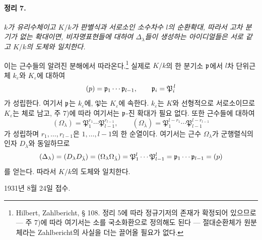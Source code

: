 \paragraph{정리 7.}
\emph{\(k\)가 유리수체이고 \(K/k\)가 판별식과 서로소인 소수차수 \(l\)의 순환확대, 따라서 고차 분기가 없는 확대이면, 비자명표현들에 대하여 \(\Delta_\lambda\)들이 생성하는 아이디얼들은 서로 같고 \(K/k\)의 도체와 일치한다.}

이는 근수들의 알려진 분해에서 따라온다.\footnote{Hilbert, Zahlbericht, § 108. 정리 5에 따라 정규기저의 존재가 확정되어 있으므로 --- 주 7)에 따라 여기서는 소를 국소화환으로 정의해도 된다 --- 절대순환체가 원분체라는 Zahlbericht의 사실을 더는 끌어올 필요가 없다.} 실제로 \(K/k\)의 한 분기소 \(\mathfrak p\)에서 \(l\)차 단위근체 \(k_\varepsilon\)와 \(K_\varepsilon\)에 대하여
\[
(p)=\mathfrak p_1\cdots\mathfrak p_{l-1},
\qquad
\mathfrak p_i=\mathfrak P_i^{\,l}
\]
가 성립한다. 여기서 \(\mathfrak p\)는 \(k_\varepsilon\)에, \(\mathfrak P\)는 \(K_\varepsilon\)에 속한다. \(k_\varepsilon\)는 \(K\)와 선형적으로 서로소이므로 \(K_\varepsilon\)는 체로 남고, 주 7)에 따라 여기서는 \(\mathfrak p\)-진 확대가 필요 없다. 또한 근수들에 대하여
\[
(\Omega_\lambda)=
\mathfrak P_1^{r_1}\cdots\mathfrak P_{l-1}^{r_{l-1}},
\qquad
(\Omega_{\bar\lambda})=
\mathfrak P_1^{l-r_1}\cdots\mathfrak P_{l-1}^{l-r_{l-1}}
\]
가 성립하며 \(r_1,\ldots,r_{l-1}\)은 \(1,\ldots,l-1\)의 한 순열이다. 여기서는 근수 \(\Omega_\lambda\)가 군행렬식의 인자 \(D_\lambda\)와 동일하므로
\[
(\Delta_\lambda)=(D_\lambda D_{\bar\lambda})
=(\Omega_\lambda\Omega_{\bar\lambda})
=\mathfrak P_1^l\cdots\mathfrak P_{l-1}^l
=\mathfrak p_1\cdots\mathfrak p_{l-1}=(p)
\]
를 얻는다. 따라서 \(K/k\)의 도체와 일치한다.

\begin{center}
1931년 8월 24일 접수.
\end{center}
